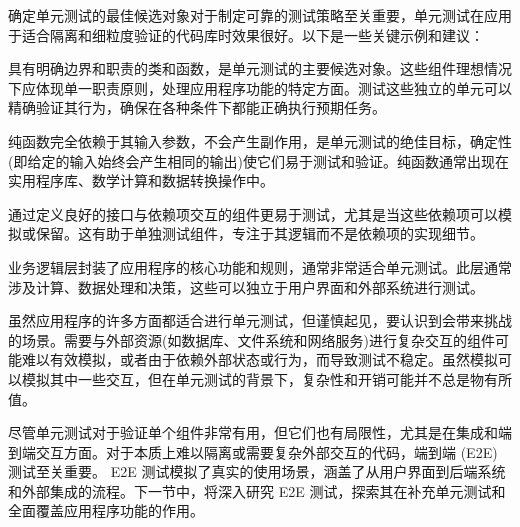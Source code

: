 确定单元测试的最佳候选对象对于制定可靠的测试策略至关重要，单元测试在应用于适合隔离和细粒度验证的代码库时效果很好。以下是一些关键示例和建议：

具有明确边界和职责的类和函数，是单元测试的主要候选对象。这些组件理想情况下应体现单一职责原则，处理应用程序功能的特定方面。测试这些独立的单元可以精确验证其行为，确保在各种条件下都能正确执行预期任务。

纯函数完全依赖于其输入参数，不会产生副作用，是单元测试的绝佳目标，确定性(即给定的输入始终会产生相同的输出)使它们易于测试和验证。纯函数通常出现在实用程序库、数学计算和数据转换操作中。

通过定义良好的接口与依赖项交互的组件更易于测试，尤其是当这些依赖项可以模拟或保留。这有助于单独测试组件，专注于其逻辑而不是依赖项的实现细节。

业务逻辑层封装了应用程序的核心功能和规则，通常非常适合单元测试。此层通常涉及计算、数据处理和决策，这些可以独立于用户界面和外部系统进行测试。

虽然应用程序的许多方面都适合进行单元测试，但谨慎起见，要认识到会带来挑战的场景。需要与外部资源(如数据库、文件系统和网络服务)进行复杂交互的组件可能难以有效模拟，或者由于依赖外部状态或行为，而导致测试不稳定。虽然模拟可以模拟其中一些交互，但在单元测试的背景下，复杂性和开销可能并不总是物有所值。

尽管单元测试对于验证单个组件非常有用，但它们也有局限性，尤其是在集成和端到端交互方面。对于本质上难以隔离或需要复杂外部交互的代码，端到端 (E2E) 测试至关重要。 E2E 测试模拟了真实的使用场景，涵盖了从用户界面到后端系统和外部集成的流程。下一节中，将深入研究 E2E 测试，探索其在补充单元测试和全面覆盖应用程序功能的作用。












